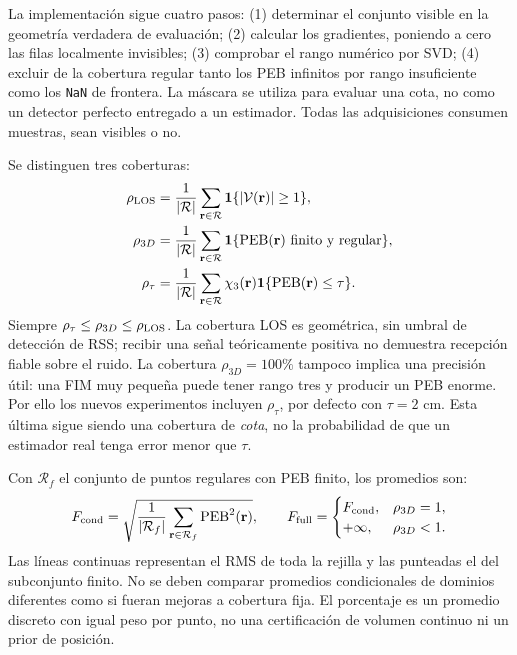 \documentclass[11pt,a4paper]{article}
\newcommand{\PEB}{\operatorname{PEB}}
\begin{document}
La implementación sigue cuatro pasos: (1) determinar el conjunto visible en la geometría verdadera de evaluación; (2) calcular los gradientes, poniendo a cero las filas localmente invisibles; (3) comprobar el rango numérico por SVD; (4) excluir de la cobertura regular tanto los PEB infinitos por rango insuficiente como los \texttt{NaN} de frontera. La máscara se utiliza para evaluar una cota, no como un detector perfecto entregado a un estimador. Todas las adquisiciones consumen muestras, sean visibles o no.

Se distinguen tres coberturas:
\begin{align}
\rho_{\rm LOS}&=\frac1{|\mathcal R|}\sum_{\mathbf r\in\mathcal R}\mathbf1\{|\mathcal V(\mathbf r)|\geq1\},\\
\rho_{3D}&=\frac1{|\mathcal R|}\sum_{\mathbf r\in\mathcal R}\mathbf1\{\PEB(\mathbf r)\text{ finito y regular}\},\\
\rho_{\tau}&=\frac1{|\mathcal R|}\sum_{\mathbf r\in\mathcal R}\chi_3(\mathbf r)\mathbf1\{\PEB(\mathbf r)\leq\tau\}.
\label{eq:coverage_target}
\end{align}
Siempre $\rho_\tau\leq\rho_{3D}\leq\rho_{\rm LOS}$. La cobertura LOS es geométrica, sin umbral de detección de RSS; recibir una señal teóricamente positiva no demuestra recepción fiable sobre el ruido. La cobertura $\rho_{3D}=100\%$ tampoco implica una precisión útil: una FIM muy pequeña puede tener rango tres y producir un PEB enorme. Por ello los nuevos experimentos incluyen $\rho_\tau$, por defecto con $\tau=2$ cm. Esta última sigue siendo una cobertura de \emph{cota}, no la probabilidad de que un estimador real tenga error menor que $\tau$.

Con $\mathcal R_f$ el conjunto de puntos regulares con PEB finito, los promedios son:
\begin{equation}
F_{\rm cond}=\sqrt{\frac1{|\mathcal R_f|}\sum_{\mathbf r\in\mathcal R_f}\PEB^2(\mathbf r)},\qquad
F_{\rm full}=\begin{cases}F_{\rm cond},&\rho_{3D}=1,\\+\infty,&\rho_{3D}<1.\end{cases}
\end{equation}
Las líneas continuas representan el RMS de toda la rejilla y las punteadas el del subconjunto finito. No se deben comparar promedios condicionales de dominios diferentes como si fueran mejoras a cobertura fija. El porcentaje es un promedio discreto con igual peso por punto, no una certificación de volumen continuo ni un prior de posición.
\end{document}
